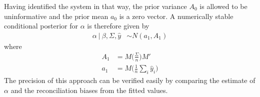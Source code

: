 \documentclass[a4paper,fleqn,11pt]{article}
\begin{document}
 Having identified the system in that way, the prior variance $A_0$ is allowed to be uninformative and the prior mean $a_0$ is a zero vector. A numerically stable conditional posterior for $\alpha$ is therefore given by
\begin{align}
	\label{eq:alpha}
	\alpha\ |\ \beta,\Sigma,\hat{y} &\sim N(a_1,A_1)
\end{align}
where
\begin{align*}
	A_1 &= M\Bigg(\frac{\Sigma}{n}\Bigg)M'\\
	a_1 &= M\Bigg(\frac{1}{n}\sum_i \hat{y}_i\Bigg) 
\end{align*}
The precision of this approach can be verified easily by comparing the estimate of $\alpha$ and the reconciliation biases from the fitted values. \\
\end{document}
